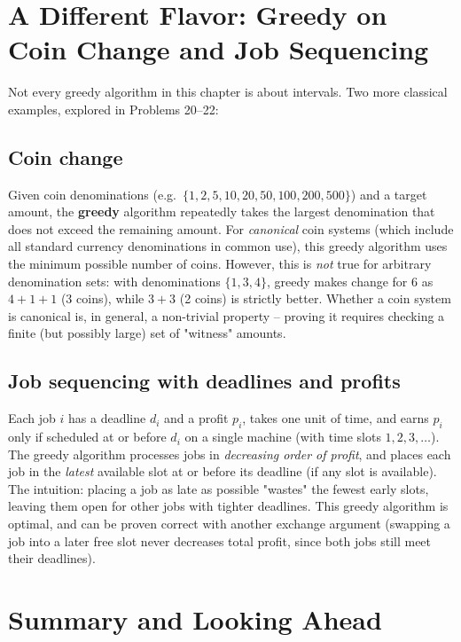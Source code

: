 \documentclass[11pt]{article}
\begin{document}
\section{A Different Flavor: Greedy on Coin Change and Job Sequencing}

Not every greedy algorithm in this chapter is about intervals. Two more classical
examples, explored in Problems 20--22:

\subsection{Coin change}

Given coin denominations (e.g.\ $\{1, 2, 5, 10, 20, 50, 100, 200, 500\}$) and a target
amount, the \textbf{greedy} algorithm repeatedly takes the largest denomination that does
not exceed the remaining amount. For \emph{canonical} coin systems (which include all
standard currency denominations in common use), this greedy algorithm uses the minimum
possible number of coins. However, this is \emph{not} true for arbitrary denomination
sets: with denominations $\{1, 3, 4\}$, greedy makes change for $6$ as $4+1+1$ (3 coins),
while $3+3$ (2 coins) is strictly better. Whether a coin system is canonical is, in
general, a non-trivial property -- proving it requires checking a finite (but possibly
large) set of "witness" amounts.

\subsection{Job sequencing with deadlines and profits}

Each job $i$ has a deadline $d_i$ and a profit $p_i$, takes one unit of time, and earns
$p_i$ only if scheduled at or before $d_i$ on a single machine (with time slots $1, 2, 3,
\ldots$). The greedy algorithm processes jobs in \emph{decreasing order of profit}, and
places each job in the \emph{latest} available slot at or before its deadline (if any slot
is available). The intuition: placing a job as late as possible "wastes" the fewest early
slots, leaving them open for other jobs with tighter deadlines. This greedy algorithm is
optimal, and can be proven correct with another exchange argument (swapping a job into a
later free slot never decreases total profit, since both jobs still meet their
deadlines).

\section{Summary and Looking Ahead}
\end{document}
